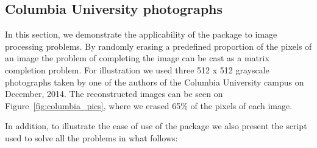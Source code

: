\documentclass[12pt]{article}
\begin{document}
\begin{table}[h]
\centering
{}
\caption{RMSE vs Step Size vs Rank}
\end{table}

\clearpage
\subsection*{Columbia University photographs}
In this section, we demonstrate the applicability of the package to image processing problems. By randomly erasing a predefined proportion of the pixels of an image the problem of completing the image can be cast as a matrix completion problem. For illustration we used three  512 x 512 grayscale photographs taken by one of the authors of the Columbia University campus on December, 2014. The reconstructed images can be seen on Figure~\ref{fig:columbia_pics}, where we erased 65\% of the pixels of each image. 

In addition, to illustrate the ease of use of the package we also present the script used to solve all the problems in what follows:


\end{document}

